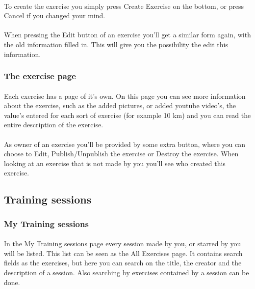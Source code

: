 \documentclass[11pt,a4paper]{scrartcl}
\begin{document}
\paragraph{}To create the exercise you simply press Create Exercise on the bottom, or press Cancel if you changed your mind.
\paragraph{}When pressing the Edit button of an exercise you'll get a similar form again, with the old information filled in. This will give you the possibility the edit this information.

\subsubsection{The exercise page}
\paragraph{}Each exercise has a page of it's own. On this page you can see more information about the exercise, such as the added pictures, or added youtube video's, the value's entered for each sort of exercise (for example 10 km) and you can read the entire description of the exercise.
\paragraph{}As owner of an exercise you'll be provided by some extra button, where you can choose to Edit, Publish/Unpublish the exercise or Destroy the exercise. When looking at an exercise that is not made by you you'll see who created this exercise.

\subsection{Training sessions}
\subsubsection{My Training sessions}
\paragraph{}In the My Training sessions page every session made by you, or starred by you will be listed. This list can be seen as the All Exercises page. It contains search fields as the exercises, but here you can search on the title, the creator and the description of a session. Also searching by exercises contained by a session can be done.
\end{document}
